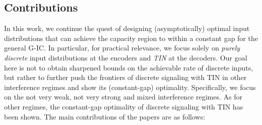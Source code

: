 \documentclass[12pt, draftclsnofoot, onecolumn]{IEEEtran}
\theoremstyle{definition}
\begin{document}
%





\subsection{Contributions}
In this work, we continue the quest of designing (asymptotically) optimal input distributions that can achieve the capacity region to within a constant gap for the general G-IC. In particular, for practical relevance, we focus solely on {\it purely discrete} input distributions at the encoders and {\it TIN} at the decoders. Our goal here is not to obtain sharpened bounds on the achievable rate of discrete inputs, but rather to further push the frontiers of discrete signaling with TIN in other interference regimes and show its (constant-gap) optimality. Specifically, we focus on the not very weak, not very strong and mixed interference regimes. As for other regimes, the constant-gap optimality of discrete signaling with TIN has been shown. The main contributions of the papers are as follows:
\end{document}
